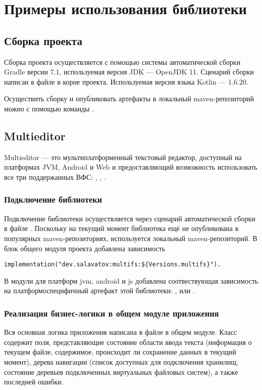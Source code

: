 \section{Примеры использования библиотеки}\label{usage-examples}

\subsection{Сборка проекта}
  Сборка проекта осуществляется с помощью системы автоматической сборки Gradle\cite{gradle} версии 7.1, используемая версия JDK --- OpenJDK 11. Сценарий сборки написан в файле  в корне проекта. Используемая версия языка Kotlin --- 1.6.20.

  Осуществить сборку и опубликовать артефакты в локальный maven-репозиторий можно с помощью команды .

\subsection{Multieditor}
  Multieditor\cite{gh-multieditor} --- это мультиплатформенный текстовый редактор, доступный на платформах JVM, Android и Web и предоставляющий возможность использовать все три поддержанных ВФС: , , .

  \subsubsection{Подключение библиотеки}
    Подключение библиотеки  осуществляется через сценарий автоматической сборки в файле . Поскольку на текущий момент библиотека ещё не опубликована в популярных maven-репозиториях, используется локальный maven-репозиторий. В блок  общего модуля проекта добавлена зависимость
    \begin{verbatim}
implementation("dev.salavatov:multifs:${Versions.multifs}").
    \end{verbatim}
    В модули для платформ jvm, android и js добавлена соотвествующая зависимость на платформоспецифичный артефакт этой библиотеки: ,  или .
  \subsubsection{Реализация бизнес-логики в общем модуле приложения}
    Вся основная логика приложения написана в файле  в общем модуле.
    Класс  содержит поля, представляющие состояние области ввода текста (информация о текущем файле, содержимое, происходит ли сохранение данных в текущий момент), дерева навигации (список доступных для подключения хранилищ, состояние деревьев подключенных виртуальных файловых систем), а также последней ошибки.

